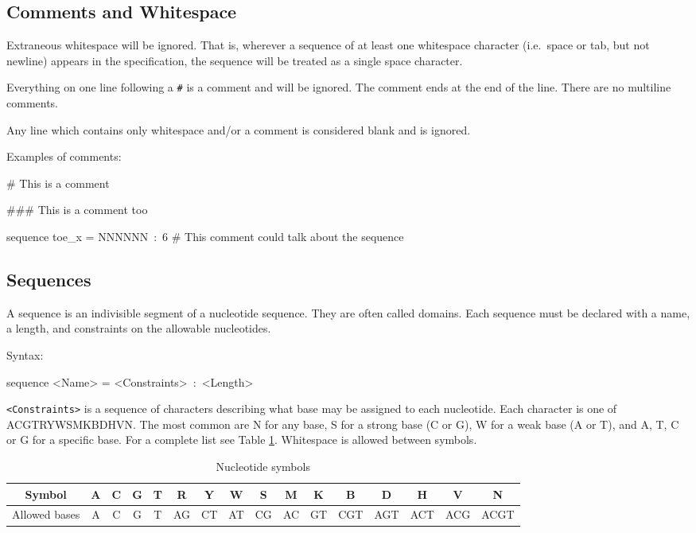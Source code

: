 \documentclass{article}
\newenvironment{code}
{\vspace{-0.1in}\par\begin{list}{}{
\setlength{\listparindent}{0pt}
\raggedright
\setlength{\itemsep}{0pt}
\setlength{\parsep}{0pt}
\normalfont\ttfamily}
 \item[]}
{\end{list}\vspace{-0.1in}}
\begin{document}
\subsection{Comments and Whitespace}

Extraneous whitespace will be ignored. That is, wherever a sequence of at least one whitespace character (i.e.\ space or tab, but not newline) appears in the specification, the sequence will be treated as a single space character.

Everything on one line following a \texttt{\#} is a comment and will be ignored. The comment ends at the end of the line. There are no multiline comments.

Any line which contains only whitespace and/or a comment is considered blank and is ignored.

\pagebreak
Examples of comments:
\begin{code}
\# This is a comment

\#\#\# This is a comment too

sequence toe\_x = NNNNNN~:~6   \# This comment could talk about the sequence 
\end{code}

\subsection{Sequences}

A sequence is an indivisible segment of a nucleotide sequence. They are often called domains. Each sequence must be declared with a name, a length, and constraints on the allowable nucleotides.

Syntax:
\begin{code}
sequence <Name> = <Constraints>~:~<Length>
\end{code}
\texttt{<Constraints>} is a sequence of characters describing what base may be assigned to each nucleotide. Each character is one of ACGTRYWSMKBDHVN. The most common are N for any base, S for a strong base (C or G), W for a weak base (A or T), and A, T, C or G for a specific base. For a complete list see Table \ref{tab:Nucleotide-symbols}. Whitespace is allowed between symbols. 

\begin{table}[b]
\noindent \begin{centering}
\begin{tabular}{|c|c|c|c|c|c|c|c|c|c|c|c|c|c|c|c|}
\hline
Symbol & A & C & G & T & R & Y & W & S & M & K & B & D & H & V & N\\
\hline 
Allowed bases & A & C & G & T & AG & CT & AT & CG & AC & GT & CGT & AGT & ACT & ACG & ACGT\\
\hline
\end{tabular}
\par\end{centering}

\caption{\label{tab:Nucleotide-symbols}Nucleotide symbols}
\end{table}
\end{document}
